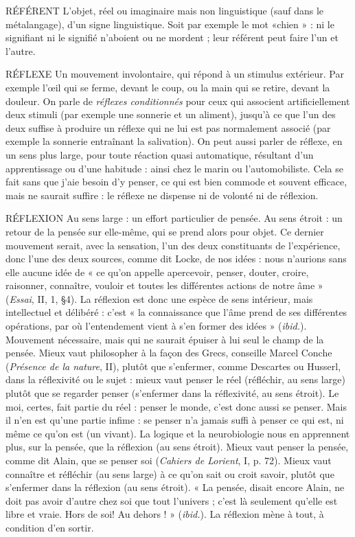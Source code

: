 RÉFÉRENT L'objet, réel ou imaginaire mais non linguistique (sauf dans le
métalangage), d’un signe linguistique. Soit par exemple le mot
«chien » : ni le signifiant ni le signifié n’aboient ou ne mordent ; leur référent
peut faire l’un et l’autre.

RÉFLEXE Un mouvement involontaire, qui répond à un stimulus extérieur.
Par exemple l’œil qui se ferme, devant le coup, ou la main qui se
retire, devant la douleur. On parle de {\it réflexes conditionnés} pour ceux qui associent
artificiellement deux stimuli (par exemple une sonnerie et un aliment),
jusqu’à ce que l’un des deux suffise à produire un réflexe qui ne lui est pas normalement
associé (par exemple la sonnerie entraînant la salivation). On peut
aussi parler de réflexe, en un sens plus large, pour toute réaction quasi automatique,
résultant d’un apprentissage ou d’une habitude : ainsi chez le marin ou
l’automobiliste. Cela se fait sans que j'aie besoin d’y penser, ce qui est bien
commode et souvent efficace, mais ne saurait suffire : le réflexe ne dispense ni
de volonté ni de réflexion.

RÉFLEXION Au sens large : un effort particulier de pensée. Au sens étroit :
un retour de la pensée sur elle-même, qui se prend alors pour
objet. Ce dernier mouvement serait, avec la sensation, l’un des deux constituants
de l’expérience, donc l’une des deux sources, comme dit Locke, de nos
idées : nous n’aurions sans elle aucune idée de « ce qu’on appelle apercevoir,
penser, douter, croire, raisonner, connaître, vouloir et toutes les différentes
actions de notre âme » ({\it Essai}, II, 1, \S 4). La réflexion est donc une espèce de
sens intérieur, mais intellectuel et délibéré : c’est « la connaissance que l’âme
prend de ses différentes opérations, par où l’entendement vient à s’en former
des idées » ({\it ibid.}). Mouvement nécessaire, mais qui ne saurait épuiser à lui seul
le champ de la pensée. Mieux vaut philosopher à la façon des Grecs, conseille
Marcel Conche ({\it Présence de la nature}, II), plutôt que s’enfermer, comme Descartes
ou Husserl, dans la réflexivité ou le sujet : mieux vaut penser le réel
(réfléchir, au sens large) plutôt que se regarder penser (s’enfermer dans la
réflexivité, au sens étroit). Le moi, certes, fait partie du réel : penser le monde,
c’est donc aussi se penser. Mais il n’en est qu’une partie infime : se penser n’a
jamais suffi à penser ce qui est, ni même ce qu’on est (un vivant). La logique et
la neurobiologie nous en apprennent plus, sur la pensée, que la réflexion (au
sens étroit). Mieux vaut penser la pensée, comme dit Alain, que se penser soi
({\it Cahiers de Lorient}, I, p. 72). Mieux vaut connaître et réfléchir (au sens large) à
ce qu'on sait ou croit savoir, plutôt que s’enfermer dans la réflexion (au sens
étroit). « La pensée, disait encore Alain, ne doit pas avoir d’autre chez soi que
tout l’univers ; c’est là seulement qu’elle est libre et vraie. Hors de soi! Au
dehors ! » ({\it ibid.}). La réflexion mène à tout, à condition d’en sortir.

